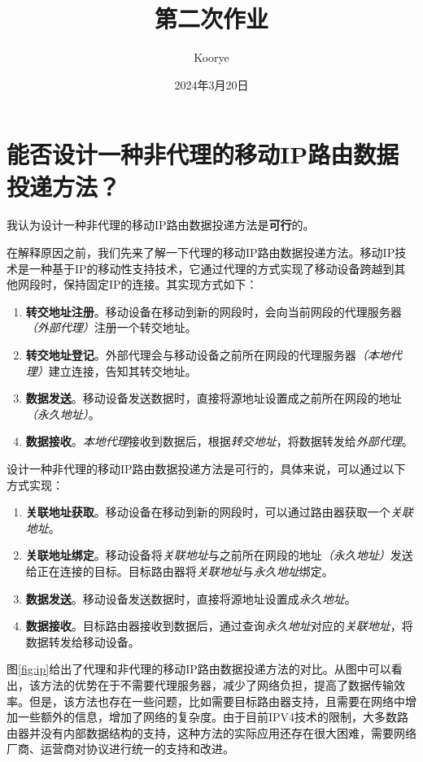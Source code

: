 \documentclass{article}
\title{第二次作业}
\author{Koorye}
\date{2024年3月20日}
\begin{document}
\maketitle
\thispagestyle{fancy}

\section{能否设计一种非代理的移动IP路由数据投递方法？}

我认为设计一种非代理的移动IP路由数据投递方法是\textbf{可行}的。

在解释原因之前，我们先来了解一下代理的移动IP路由数据投递方法。移动IP技术是一种基于IP的移动性支持技术，它通过代理的方式实现了移动设备跨越到其他网段时，保持固定IP的连接。其实现方式如下：

\begin{enumerate}
    \item \textbf{转交地址注册}。移动设备在移动到新的网段时，会向当前网段的代理服务器\textit{（外部代理）}注册一个转交地址。
    \item \textbf{转交地址登记}。外部代理会与移动设备之前所在网段的代理服务器\textit{（本地代理）}建立连接，告知其转交地址。
    \item \textbf{数据发送}。移动设备发送数据时，直接将源地址设置成之前所在网段的地址\textit{（永久地址）}。
    \item \textbf{数据接收}。\textit{本地代理}接收到数据后，根据\textit{转交地址}，将数据转发给\textit{外部代理}。
\end{enumerate}

设计一种非代理的移动IP路由数据投递方法是可行的，具体来说，可以通过以下方式实现：

\begin{enumerate}
    \item \textbf{关联地址获取}。移动设备在移动到新的网段时，可以通过路由器获取一个\textit{关联地址}。
    \item \textbf{关联地址绑定}。移动设备将\textit{关联地址}与之前所在网段的地址\textit{（永久地址）}发送给正在连接的目标。目标路由器将\textit{关联地址}与\textit{永久地址}绑定。
    \item \textbf{数据发送}。移动设备发送数据时，直接将源地址设置成\textit{永久地址}。
    \item \textbf{数据接收}。目标路由器接收到数据后，通过查询\textit{永久地址}对应的\textit{关联地址}，将数据转发给移动设备。
\end{enumerate}

图\ref{fig:ip}给出了代理和非代理的移动IP路由数据投递方法的对比。从图中可以看出，该方法的优势在于不需要代理服务器，减少了网络负担，提高了数据传输效率。但是，该方法也存在一些问题，比如需要目标路由器支持，且需要在网络中增加一些额外的信息，增加了网络的复杂度。由于目前IPV4技术的限制，大多数路由器并没有内部数据结构的支持，这种方法的实际应用还存在很大困难，需要网络厂商、运营商对协议进行统一的支持和改进。
\end{document}
